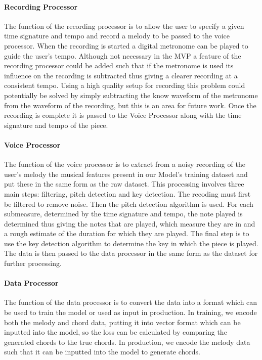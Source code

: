 \paragraph{Recording Processor}

The function of the recording processor is to allow the user to specify a given time signature and tempo and record a melody to be passed to the voice processor.
When the recording is started a digital metronome can be played to guide the user's tempo. 
Although not necessary in the MVP a feature of the recording processor could be added such that if the metronome is used its influence on the recording is subtracted thus giving a clearer recording at a consistent tempo.
Using a high quality setup for recording this problem could potentially be solved by simply subtracting the know waveform of the metronome from the waveform of the recording, but this is an area for future work.
Once the recording is complete it is passed to the Voice Processor along with the time signature and tempo of the piece.

\paragraph{Voice Processor}

The function of the voice processor is to extract from a noisy recording of the user's melody the musical features present in our Model's training dataset and put these in the same form as the raw dataset.
This processing involves three main steps: filtering, pitch detection and key detection.
The recoding must first be filtered to remove noise.
Then the pitch detection algorithm is used.
For each submeasure, determined by the time signature and tempo, the note played is determined thus giving the notes that are played, which measure they are in and a rough estimate of the duration for which they are played.
The final step is to use the key detection algorithm to determine the key in which the piece is played.
The data is then passed to the data processor in the same form as the dataset for further processing.

\paragraph{Data Processor}

The function of the data processor is to convert the data into a format which can be used to train the model or used as input in production.
In training, we encode both the melody and chord data, putting it into vector format which can be inputted into the model, so the loss can be calculated by comparing the generated chords to the true chords.
In production, we encode the melody data such that it can be inputted into the model to generate chords.

